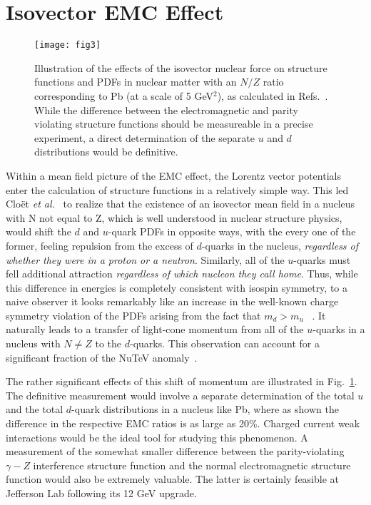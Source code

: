 \documentclass{ws-ijmpe}
\begin{document}
\section{Isovector EMC Effect}
%
\begin{figure}[th]
\centerline{\texttt{[image: fig3]}}
\caption{Illustration of the effects of the isovector nuclear force on structure functions and PDFs in nuclear matter with 
an $N/Z$ ratio corresponding to Pb (at a scale of 5 GeV$^2$), as calculated in Refs.~\cite{Cloet:2009qs,Cloet:2012td}. While the difference between the electromagnetic and parity violating structure functions should be measureable in a precise experiment, a direct determination of the separate $u$ and $d$ distributions would be definitive.}
\label{fig:fig3}
\end{figure}
%
Within a mean field picture of the EMC effect, the Lorentz vector potentials enter the calculation of structure functions in a relatively simple way. This led Clo\"et {\it et al.}~\cite{Cloet:2009qs,Cloet:2012td}
 to realize that the existence of an isovector mean field in a nucleus with N not equal to Z, which is well understood in nuclear structure physics, would shift the $d$ and $u$-quark PDFs in opposite ways, with the every one of the former, feeling repulsion from the excess of $d$-quarks in the nucleus, {\em regardless of whether they were in a proton or a neutron}. Similarly, all of the $u$-quarks must fell additional attraction {\em regardless of which nucleon they call home}. Thus, while this difference in energies is completely consistent with isospin symmetry, to a naive observer it looks remarkably like an increase in the well-known charge symmetry violation of the PDFs arising from the fact that $m_d>m_u$~\cite{Londergan:2009kj,Rodionov:1994cg}
. It naturally leads to a transfer of light-cone momentum from all of 
the $u$-quarks in a nucleus with $N\neq Z$ to the $d$-quarks. This observation can account for a significant fraction of the NuTeV anomaly~\cite{Cloet:2009qs,Bentz:2009yy}.

The rather significant effects of this shift of momentum are illustrated in Fig.~\ref{fig:fig3}. The definitive measurement would involve a separate determination of the total $u$ and the total $d$-quark distributions in a nucleus like Pb, where as shown the difference in the respective EMC ratios is as large as 20\%. Charged current weak interactions would be the ideal tool for studying this phenomenon. A measurement of the somewhat smaller difference between the parity-violating $\gamma-Z$ interference structure function and the normal electromagnetic structure function would also be extremely valuable. The latter is certainly feasible at Jefferson Lab following its 12 GeV upgrade.
\end{document}
